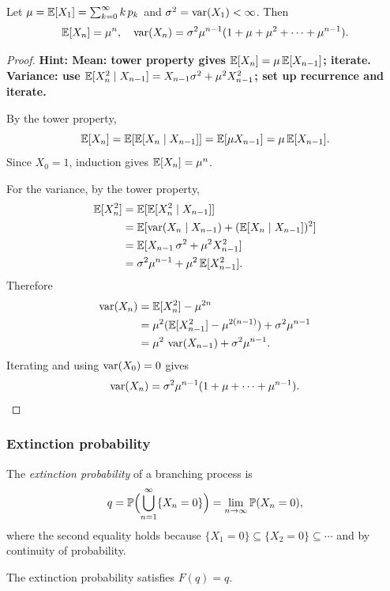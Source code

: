 \documentclass[a4paper]{article}
\begin{document}
\begin{thm}
  Let $\mu = \E[X_1] = \sum_{k=0}^\infty k\,p_k$ and $\sigma^2 = \var(X_1) < \infty$.
  Then
  \[
    \E[X_n] = \mu^n, \quad \var(X_n) = \sigma^2 \mu^{n-1}(1 + \mu + \mu^2 + \cdots + \mu^{n-1}).
  \]
\end{thm}

\begin{proof}
  \textbf{Hint: Mean: tower property gives $\E[X_n] = \mu\,\E[X_{n-1}]$; iterate. Variance: use $\E[X_n^2 \mid X_{n-1}] = X_{n-1}\sigma^2 + \mu^2 X_{n-1}^2$; set up recurrence and iterate.}

  By the tower property,
  \[
    \E[X_n] = \E[\E[X_n \mid X_{n-1}]] = \E[\mu X_{n-1}] = \mu\,\E[X_{n-1}].
  \]
  Since $X_0 = 1$, induction gives $\E[X_n] = \mu^n$.

  For the variance, by the tower property,
  \begin{align*}
    \E[X_n^2]
    &= \E[\E[X_n^2 \mid X_{n-1}]]\\
    &= \E[\var(X_n \mid X_{n-1}) + (\E[X_n \mid X_{n-1}])^2]\\
    &= \E[X_{n-1}\,\sigma^2 + \mu^2 X_{n-1}^2]\\
    &= \sigma^2 \mu^{n-1} + \mu^2\,\E[X_{n-1}^2].
  \end{align*}
  Therefore
  \begin{align*}
    \var(X_n)
    &= \E[X_n^2] - \mu^{2n}\\
    &= \mu^2(\E[X_{n-1}^2] - \mu^{2(n-1)}) + \sigma^2 \mu^{n-1}\\
    &= \mu^2\,\var(X_{n-1}) + \sigma^2 \mu^{n-1}.
  \end{align*}
  Iterating and using $\var(X_0) = 0$ gives
  \[
    \var(X_n) = \sigma^2 \mu^{n-1}(1 + \mu + \cdots + \mu^{n-1}). \qedhere
  \]
\end{proof}

\subsubsection*{Extinction probability}
\begin{defi}
  The \emph{extinction probability} of a branching process is
  \[
    q = \P\Bigl(\bigcup_{n=1}^\infty \{X_n = 0\}\Bigr) = \lim_{n \to \infty} \P(X_n = 0),
  \]
  where the second equality holds because $\{X_1 = 0\} \subseteq \{X_2 = 0\} \subseteq \cdots$ and by continuity of probability.
\end{defi}

\begin{prop}
  The extinction probability satisfies $F(q) = q$.
\end{prop}
\end{document}
